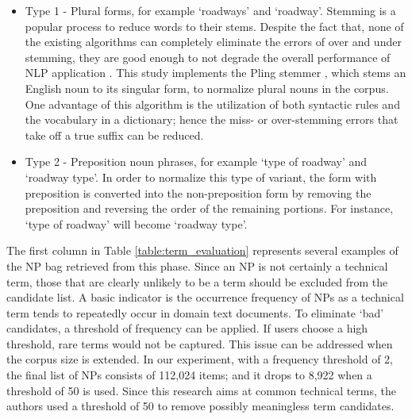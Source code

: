 \documentclass[Journal, BackFigs, DoubleSpace]{ascelike}%
\begin{document}
\begin{enumerate} [label=\roman*]
\begin{itemize}
		\item Type 1 - Plural forms, for example `roadways' and `roadway'. Stemming is a popular process to reduce words to their stems. Despite the fact that, none of the existing algorithms can completely eliminate the errors of over and under stemming, they are good enough to not degrade the overall performance of NLP application \cite{jivani2011stemmer}. This study implements the Pling stemmer \cite{suchanek2006stemmer}, which stems an English noun to its singular form, to normalize plural nouns in the corpus. One advantage of this algorithm is the utilization of both syntactic rules and the vocabulary in a dictionary; hence the miss- or over-stemming errors that take off a true suffix can be reduced. 
		\item Type 2 - Preposition noun phrases, for example `type of roadway' and `roadway type'. In order to normalize this type of variant, the form with preposition is converted into the non-preposition form by removing the preposition and reversing the order of the remaining portions. For instance, `type of roadway' will become `roadway type'.
\end{itemize}
\end{enumerate}
%
\par
The first column in Table \ref{table:term_evaluation} represents several examples of the NP bag retrieved from this phase. Since an NP is not certainly a technical term, those that are clearly unlikely to be a term should be excluded from the candidate list. A basic indicator is the occurrence frequency of NPs as a technical term tends to repeatedly occur in domain text documents. To eliminate `bad' candidates, a threshold of frequency can be applied. If users choose a high threshold, rare terms would not be captured. This issue can be addressed when the corpus size is extended. In our experiment, with a frequency threshold of 2, the final list of NPs consists of 112,024 items; and it drops to 8,922 when a threshold of 50 is used. Since this research aims at common technical terms, the authors used a threshold of 50 to remove possibly meaningless term candidates. 
%	
\end{document}
